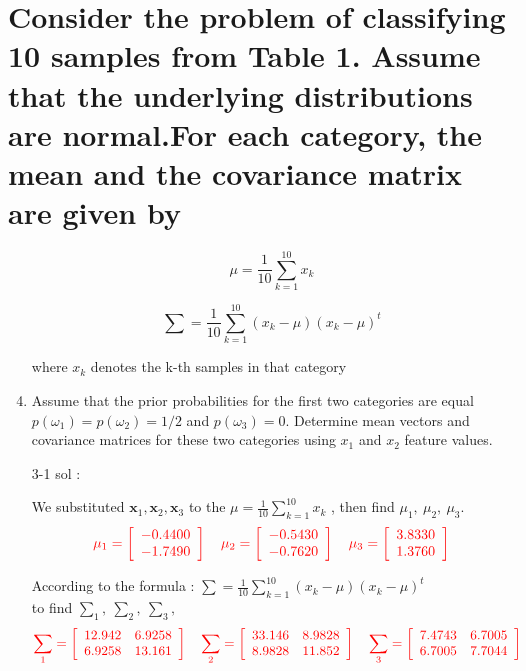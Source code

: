 \documentclass[14pt]{report}
\begin{document}
	\section{Consider the problem of classifying 10 samples from Table 1. Assume that the underlying distributions are normal.For each category, the mean and the covariance matrix are given by}
	\begin{enumerate}
		\item[] \[ \mu=\frac{1}{10}\sum^{10}_{k=1}x_k \]
		\item[] \[\sum=\frac{1}{10}\sum^{10}_{k=1}(x_k-\mu){(x_k-\mu)}^t\]
		\item[] where $x_k$ denotes the k-th samples in that category
		\item Assume that the prior probabilities for the first two categories are equal $p(\omega_1)=p(\omega_2)=1/2$ and $p(\omega_3)=0$. Determine mean vectors and covariance matrices for these two categories using $x_1$ and $x_2$ feature values.
		\item[3-1] sol : 
		\item[] We substituted \textbf{$\textbf{x}_1,\textbf{x}_2,\textbf{x}_3$} to the $\mu =\frac{1}{10}\sum^{10}_{k=1}x_k$ , then find $\mu_1,\ \mu_2,\ \mu_3$.
		\[\color{red}
		\mu_1= \left[
		\begin{array}{clr}-0.4400 \\ -1.7490\end{array} \right]\quad
		\mu_2= \left[
		\begin{array}{clr}-0.5430 \\ -0.7620\end{array} \right]\quad
		\mu_3= \left[
		\begin{array}{clr}3.8330 \\ 1.3760\end{array} \right]
		\]
		\item[] According to the formula : $\sum=\frac{1}{10}\sum^{10}_{k=1}(x_k-\mu){(x_k-\mu)}^t$\\to find $\sum_1,\ \sum_2,\ \sum_3,$
		\[\color{red}
		\sum_1=\left[
		\begin{array}{clr}12.942 & 6.9258 \\ 6.9258 & 13.161\end{array} \right]\quad
		\sum_2=\left[
		\begin{array}{clr}33.146 & 8.9828 \\ 8.9828 & 11.852\end{array} \right]\quad
		\sum_3=\left[
		\begin{array}{clr}7.4743 & 6.7005 \\ 6.7005 & 7.7044\end{array} \right]\quad
\]
\end{enumerate}
\end{document}
